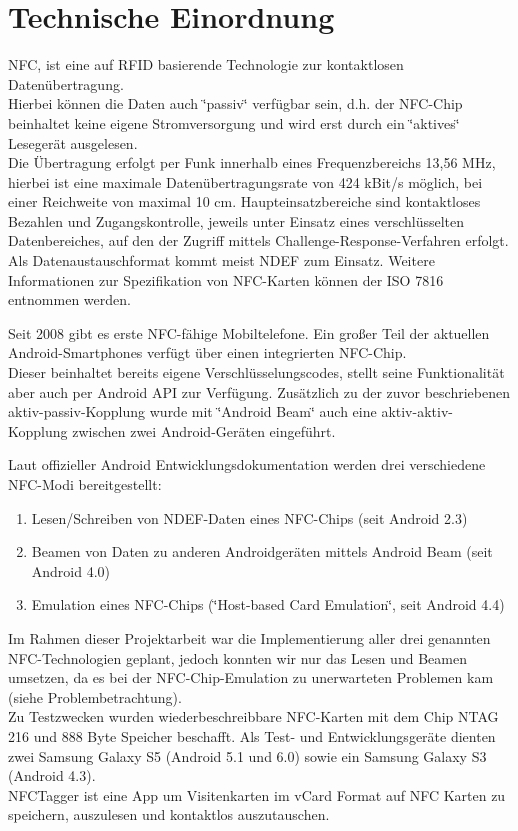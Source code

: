 \documentclass[a4paper,ngerman,12pt]{scrreprt}
\begin{document}
\chapter{Technische Einordnung}

\ac{NFC}, ist eine auf \ac{RFID} basierende Technologie zur kontaktlosen Datenübertragung. \\
Hierbei können die Daten auch \char`\"{}passiv\char`\"{} verfügbar sein, d.h. der NFC-Chip beinhaltet keine eigene Stromversorgung und wird erst durch ein \char`\"{}aktives\char`\"{} Lesegerät ausgelesen. \\
Die Übertragung erfolgt per Funk innerhalb eines Frequenzbereichs 13,56 MHz, hierbei ist eine maximale Datenübertragungsrate von 424 kBit/s möglich, bei einer Reichweite von maximal 10 cm. 
Haupteinsatzbereiche sind kontaktloses Bezahlen und Zugangskontrolle, jeweils unter Einsatz eines verschlüsselten Datenbereiches, auf den der Zugriff mittels Challenge-Response-Verfahren erfolgt. \\
Als Datenaustauschformat kommt meist \ac{NDEF} zum Einsatz. Weitere Informationen zur Spezifikation von NFC-Karten können der ISO 7816 entnommen werden.\newline

Seit 2008 gibt es erste NFC-\/fähige Mobiltelefone. Ein großer Teil der aktuellen Android-Smartphones verfügt über einen integrierten NFC-Chip. \\
Dieser beinhaltet bereits eigene Verschlüsselungscodes, stellt seine Funktionalität aber auch per Android API zur Verfügung. Zusätzlich zu der zuvor beschriebenen aktiv-\/passiv-Kopplung wurde mit \char`\"{}Android Beam\char`\"{} auch eine aktiv-\/aktiv-Kopplung zwischen zwei Android-Geräten eingeführt.

Laut offizieller Android Entwicklungsdokumentation werden drei verschiedene NFC-Modi bereitgestellt:


\begin{enumerate}[-]
\item Lesen/Schreiben von NDEF-Daten eines NFC-Chips (seit Android 2.3)
\item Beamen von Daten zu anderen Androidgeräten mittels Android Beam (seit Android 4.0)
\item Emulation eines NFC-Chips (\char`\"{}Host-\/based Card Emulation\char`\"{}, seit Android 4.4)
\end{enumerate}

Im Rahmen dieser Projektarbeit war die Implementierung aller drei genannten NFC-Technologien geplant, jedoch konnten wir nur das Lesen und Beamen umsetzen, da es bei der NFC-Chip-Emulation zu unerwarteten Problemen kam (siehe Problembetrachtung).\\ 
Zu Testzwecken wurden wiederbeschreibbare NFC-Karten mit dem Chip NTAG 216 und 888 Byte Speicher beschafft. Als Test-\/ und Entwicklungsgeräte dienten zwei Samsung Galaxy S5 (Android 5.1 und 6.0) sowie ein Samsung Galaxy S3 (Android 4.3). \\
NFCTagger ist eine App um Visitenkarten im vCard Format auf NFC Karten zu speichern, auszulesen und kontaktlos auszutauschen.
\end{document}
